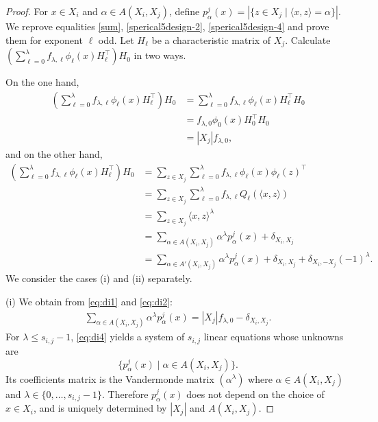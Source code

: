 \documentclass[10pt,a4paper]{amsart}
\begin{document}
\begin{proof}
    For $x\in X_i$ and $\alpha\in A(X_i,X_j)$, define $p_{\alpha}^j(x)=|\{z\in X_j \mid \langle x,z\rangle=\alpha \}|$. 
    We reprove equalities \eqref{sum}, \eqref{sperical5design-2}, \eqref{sperical5design-4} and prove them for exponent $\ell$ odd. 
    Let $H_\ell$ be a characteristic matrix of $X_j$. 
    Calculate $(\sum_{\ell=0}^\lambda f_{\lambda,\ell}\phi_{\ell}(x)H_{\ell}^\top)H_0$ in two ways. 

    On the one hand, 
    \begin{align}
        (\sum_{\ell=0}^\lambda f_{\lambda,\ell}\phi_{\ell}(x)H_{\ell}^\top)H_0&=\sum_{\ell=0}^\lambda f_{\lambda,\ell}\phi_{\ell}(x)H_{\ell}^\top H_0\nonumber\\
        &=f_{\lambda,0}\phi_{0}(x)H_{0}^\top H_0\nonumber\\
        &=|X_j|f_{\lambda,0},\label{eq:di1} 
    \end{align}
    and on the other hand, 
    \begin{align}
        (\sum_{\ell=0}^\lambda f_{\lambda,\ell}\phi_{\ell}(x)H_{\ell}^\top)H_0&=\sum_{z\in X_j}\sum_{\ell=0}^\lambda f_{\lambda,\ell}\phi_{\ell}(x)\phi_{\ell}(z)^\top \nonumber\\
        &=\sum_{z\in X_j}\sum_{\ell=0}^\lambda f_{\lambda,\ell}Q_{\ell}(\langle x,z\rangle)\nonumber\\
        &=\sum_{z\in X_j}\langle x,z\rangle^\lambda\nonumber\\
        &=\sum_{\alpha\in A(X_i,X_j)}\alpha^\lambda p_{\alpha}^j(x)+\delta_{X_i,X_j} \label{eq:di2}\\
        &=\sum_{\alpha\in A'(X_i,X_j)}\alpha^\lambda p_{\alpha}^j(x)+\delta_{X_i,X_j}+\delta_{X_i,-X_j}(-1)^\lambda. \label{eq:di3}
    \end{align}
    We consider the cases (i) and (ii) separately. 
    
    (i) We obtain from \eqref{eq:di1} and \eqref{eq:di2}:   
    \begin{align}\label{eq:di4}
        \sum_{\alpha\in A(X_i,X_j)}\alpha^\lambda p_{\alpha}^j(x)=|X_j|f_{\lambda,0}-\delta_{X_i,X_j}.
    \end{align}
    For $\lambda\leq s_{i,j}-1$, \eqref{eq:di4} yields  a system of $s_{i,j}$ linear equations whose unknowns are
    \[
    \{p_{\alpha}^j(x) \mid \alpha\in A(X_i,X_j)\}. 
    \]
    Its coefficients matrix is 
 the Vandermonde matrix $(\alpha^\lambda)$ where $\alpha\in A(X_i,X_j)$ and $\lambda\in\{0,\ldots,s_{i,j}-1\}$. 
 Therefore $p_{\alpha}^j(x)$ does not depend on the choice of $x\in X_i$, and is uniquely determined by $|X_j|$ and $A(X_i,X_j)$. 
 

\end{proof}
\end{document}
